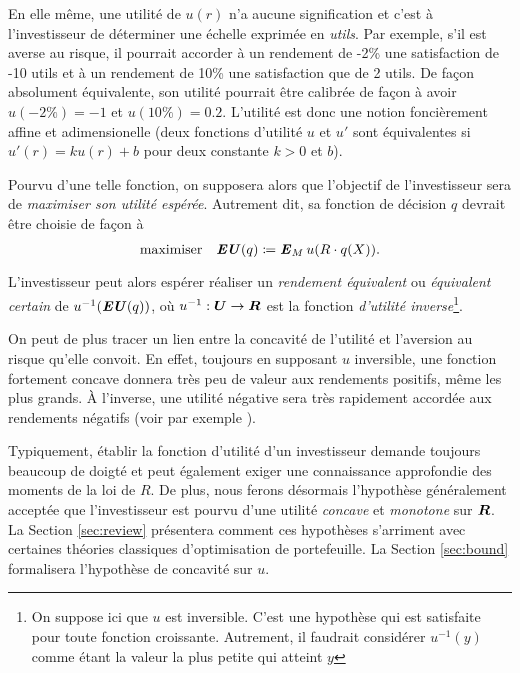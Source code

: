 En elle même, une utilité de $u(r)$ n'a aucune signification et c'est à l'investisseur de
déterminer une échelle exprimée en \textit{utils}. Par exemple, s'il est averse au risque,
il pourrait accorder à un rendement de -2\% une satisfaction de -10 utils et à un
rendement de 10\% une satisfaction que de 2 utils. De façon absolument équivalente, son
utilité pourrait être calibrée de façon à avoir $u(-2\%) = -1$ et $u(10\%) =
0.2$. L'utilité est donc une notion foncièrement affine et adimensionelle (deux fonctions
d'utilité $u$ et $u'$ sont équivalentes si $u'(r) = ku(r) + b$ pour deux constante $k>0$
et $b$).

Pourvu d'une telle fonction, on supposera alors que l'objectif de l'investisseur sera de
\textit{maximiser son utilité espérée}. Autrement dit, sa fonction de décision $q$ devrait
être choisie de façon à
\begin{equation}
  \label{in:maxeu}
  \displaystyle{\begin{array}{ll} \displaystyle{\operatorname*{\mbox{maximiser}}_{}} & \displaystyle{\operatorname{\mbox{\textbf{\textit{EU}}}}(q) \coloneqq\operatorname{\mbox{\textbf{\textit{E}}}}_M u(R\cdot q(X)).} \end{array}}
\end{equation}
L'investisseur peut alors espérer réaliser un \textit{rendement équivalent} ou
\textit{équivalent certain} de $u^{-1}(\operatorname{\mbox{\textbf{\textit{EU}}}}(q))$, où $u^{-1}:\bm{U} \to \bm{R}$ est la fonction
\textit{d'utilité inverse}\footnote{On suppose ici que $u$ est inversible. C'est une
  hypothèse qui est satisfaite pour toute fonction croissante. Autrement, il faudrait
  considérer $u^{-1}(y)$ comme étant la valeur la plus petite qui atteint $y$}.

On peut de plus tracer un lien entre la concavité de l'utilité et l'aversion au risque
qu'elle convoit. En effet, toujours en supposant $u$ inversible, une fonction fortement
concave donnera très peu de valeur aux rendements positifs, même les plus grands. À
l'inverse, une utilité négative sera très rapidement accordée aux rendements négatifs
(voir par exemple \cite{eeckhoudt2005economic}).

Typiquement, établir la fonction d'utilité d'un investisseur demande toujours beaucoup de
doigté et peut également exiger une connaissance approfondie des moments de la loi de
$R$. De plus, nous ferons désormais l'hypothèse généralement acceptée que l'investisseur
est pourvu d'une utilité \textit{concave} et \textit{monotone} sur $\bm{R}$. La Section
\ref{sec:review} présentera comment ces hypothèses s'arriment avec certaines théories
classiques d'optimisation de portefeuille. La Section \ref{sec:bound} formalisera
l'hypothèse de concavité sur $u$. 

